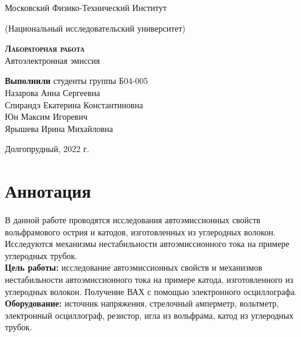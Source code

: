 \documentclass[12pt,a4paper]{article}
\begin{document}
 
\begin{titlepage}
  \begin{center}
    \large
    Московский Физико-Технический Институт
    
    (Национальный исследовательский университет)
    \vspace{0.5cm}

   
    \vspace{0.25cm}
 
    \vfill
 
    \vfill

    \textsc{\bf{Лабораторная работа}}\\[5mm]
    
    {\LARGE  Автоэлектронная эмиссия}
  \bigskip
    \vfill
    
\end{center}
\vfill
\begin{flushright}


    \textbf{Выполнили} студенты группы Б04-005 \\
    Назарова Анна Сергеевна\\
    Спирандэ Екатерина Константиновна\\
    Юн Максим Игоревич\\
    Ярышева Ирина Михайловна\\

\end{flushright}

\bigskip

\vfill

\begin{center}
  Долгопрудный, 2022 г.
\end{center}
\end{titlepage}



\section*{Аннотация}
В данной работе проводятся исследования автоэмиссионных свойств вольфрамового острия и катодов, изготовленных из углеродных волокон. Исследуются механизмы нестабильности автоэмиссионного тока на примере углеродных трубок.\\

\noindent\textbf{Цель работы: }исследование автоэмиссионных свойств и механизмов нестабильности автоэмиссионного тока на примере катода, изготовленного из углеродных волокон. Получение ВАХ с помощью электронного осциллографа.
\\ 
\noindent\textbf{Оборудование: }источник напряжения, стрелочный амперметр, вольтметр, электронный осциллограф, резистор, игла из вольфрама, катод из углеродных трубок.
\end{document}
